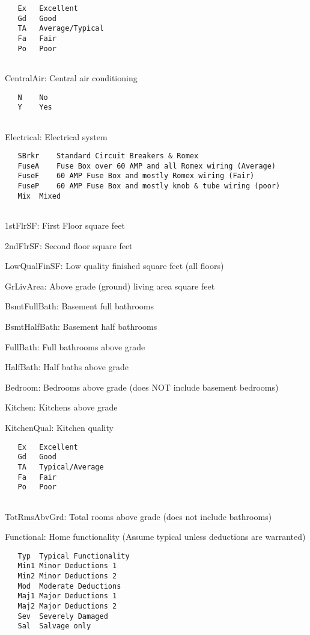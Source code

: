 \documentclass[]{article}
\begin{document}
\begin{verbatim}
   Ex   Excellent
   Gd   Good
   TA   Average/Typical
   Fa   Fair
   Po   Poor
    
\end{verbatim}

CentralAir: Central air conditioning

\begin{verbatim}
   N    No
   Y    Yes
    
\end{verbatim}

Electrical: Electrical system

\begin{verbatim}
   SBrkr    Standard Circuit Breakers & Romex
   FuseA    Fuse Box over 60 AMP and all Romex wiring (Average) 
   FuseF    60 AMP Fuse Box and mostly Romex wiring (Fair)
   FuseP    60 AMP Fuse Box and mostly knob & tube wiring (poor)
   Mix  Mixed
    
\end{verbatim}

1stFlrSF: First Floor square feet

2ndFlrSF: Second floor square feet

LowQualFinSF: Low quality finished square feet (all floors)

GrLivArea: Above grade (ground) living area square feet

BsmtFullBath: Basement full bathrooms

BsmtHalfBath: Basement half bathrooms

FullBath: Full bathrooms above grade

HalfBath: Half baths above grade

Bedroom: Bedrooms above grade (does NOT include basement bedrooms)

Kitchen: Kitchens above grade

KitchenQual: Kitchen quality

\begin{verbatim}
   Ex   Excellent
   Gd   Good
   TA   Typical/Average
   Fa   Fair
   Po   Poor
    
\end{verbatim}

TotRmsAbvGrd: Total rooms above grade (does not include bathrooms)

Functional: Home functionality (Assume typical unless deductions are
warranted)

\begin{verbatim}
   Typ  Typical Functionality
   Min1 Minor Deductions 1
   Min2 Minor Deductions 2
   Mod  Moderate Deductions
   Maj1 Major Deductions 1
   Maj2 Major Deductions 2
   Sev  Severely Damaged
   Sal  Salvage only
    
\end{verbatim}
\end{document}
